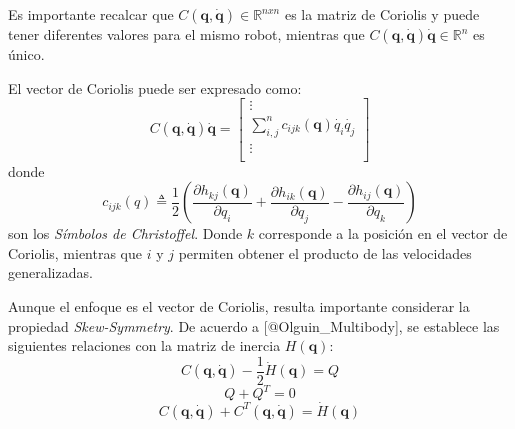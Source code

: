     Es importante recalcar que $C(\boldsymbol{q}, \boldsymbol{\dot{q}}) \in \mathbb{R}^{nxn}$ es la matriz de Coriolis y puede tener diferentes valores para el mismo robot, 
    mientras que $C(\boldsymbol{q}, \boldsymbol{\dot{q}}) \boldsymbol{\dot{q}} \in \mathbb{R}^n$ es único.

    El vector de Coriolis puede ser expresado como:
    \begin{equation}
        \label{eqn:coriolis_vector}
        C(\boldsymbol{q}, \boldsymbol{\dot{q}}) \boldsymbol{\dot{q}} = \begin{bmatrix} \vdots\\
        \sum_{i,j}^{n} c_{ijk}(\boldsymbol{q})\dot{q_{i}}\dot{q_{j}}   \\  \vdots\\ \end{bmatrix}
    \end{equation}
    donde 
    \begin{equation}
        \label{eqn:christoffel}
        c_{ijk}(q) \triangleq \frac{1}{2}\left( \frac{\partial h_{kj}(\boldsymbol{q})}{\partial q_{i}}+\frac{\partial h_{ik}(\boldsymbol{q})}{\partial q_{j}}
        -\frac{\partial h_{ij}(\boldsymbol{q})}{\partial q_{k}} \right)
    \end{equation}
    son los \emph{Símbolos de Christoffel}. Donde $k$ corresponde a la posición en el vector de Coriolis, mientras que $i$ y $j$ permiten
    obtener el producto de las velocidades generalizadas.

    Aunque el enfoque es el vector de Coriolis, resulta importante considerar la propiedad \emph{Skew-Symmetry}. De acuerdo a [@Olguin_Multibody],
    se establece las siguientes relaciones con la matriz de inercia $H(\boldsymbol{q})$:
    \begin{equation}
        \label{eqn:skew1}
        C(\boldsymbol{q}, \boldsymbol{\dot{q}}) - \frac{1}{2}\dot{H}(\boldsymbol{q}) = Q 
    \end{equation}
    \begin{equation}
        \label{eqn:skew2}
        Q + Q^T = 0
    \end{equation}
    \begin{equation}
        \label{eqn:skew3}
        C(\boldsymbol{q}, \boldsymbol{\dot{q}}) + C^T(\boldsymbol{q}, \boldsymbol{\dot{q}}) = \dot{H}(\boldsymbol{q})
    \end{equation}

